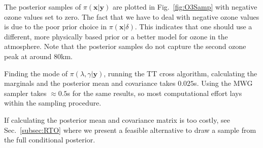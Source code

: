 The posterior samples of $\pi(\bm{x}|\bm{y})$ are plotted in Fig.~\ref{fig:O3Samp} with negative ozone values set to zero.
The fact that we have to deal with negative ozone values is due to the poor prior choice in $\pi(\bm{x}|\delta)$.
This indicates that one should use a different, more physically based prior or a better model for ozone in the atmosphere.
Note that the posterior samples do not capture the second ozone peak at around $80$km.

Finding the mode of $\pi(\lambda,\gamma|\bm{y})$, running the TT cross algorithm, calculating the marginals and the posterior mean and covariance takes $0.025$s.
Using the MWG sampler takes $\approx0.5$s for the same results, so most computational effort lays within the sampling procedure.

If calculating the posterior mean and covariance matrix is too costly, see Sec.~\ref{subsec:RTO} where we present a feasible alternative to draw a sample from the full conditional posterior.
\clearpage

%
